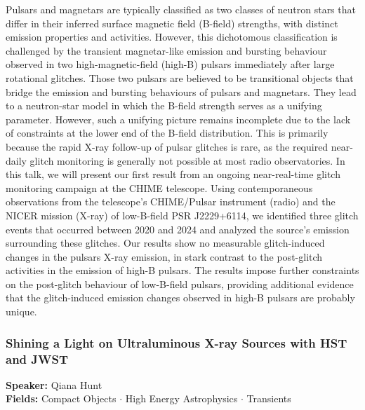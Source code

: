 Pulsars and magnetars are typically classified as two classes of neutron stars that differ in their inferred surface magnetic field (B-field) strengths, with distinct emission properties and activities. However, this dichotomous classification is challenged by the transient magnetar-like emission and bursting behaviour observed in two high-magnetic-field (high-B) pulsars immediately after large rotational glitches. Those two pulsars are believed to be transitional objects that bridge the emission and bursting behaviours of pulsars and magnetars. They lead to a neutron-star model in which the B-field strength serves as a unifying parameter. However, such a unifying picture remains incomplete due to the lack of constraints at the lower end of the B-field distribution. This is primarily because the rapid X-ray follow-up of pulsar glitches is rare, as the required near-daily glitch monitoring is generally not possible at most radio observatories. In this talk, we will present our first result from an ongoing near-real-time glitch monitoring campaign at the CHIME telescope. Using contemporaneous observations from the telescope's CHIME/Pulsar instrument (radio) and the NICER mission (X-ray) of low-B-field PSR J2229+6114, we identified three glitch events that occurred between 2020 and 2024 and analyzed the source's emission surrounding these glitches. Our results show no measurable glitch-induced changes in the pulsars X-ray emission, in stark contrast to the post-glitch activities in the emission of high-B pulsars. The results impose further constraints on the post-glitch behaviour of low-B-field pulsars, providing additional evidence that the glitch-induced emission changes observed in high-B pulsars are probably unique.

\hypertarget{abstract-talk-117}{}\label{abstract-page-talk-117}
\subsubsection*{Shining a Light on Ultraluminous X-ray Sources with HST and JWST}
\textbf{Speaker:} Qiana Hunt\\
\textbf{Fields:} Compact Objects $\cdot$ High Energy Astrophysics $\cdot$ Transients

